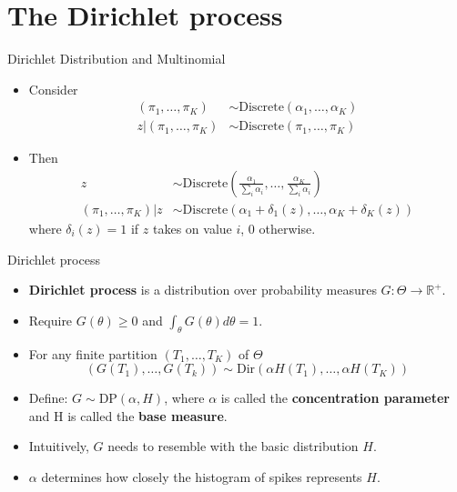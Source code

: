 \documentclass[10pt,mathserif]{beamer}
\begin{document}
\section{The Dirichlet process}
\begin{frame}{Dirichlet Distribution and Multinomial}
\begin{itemize}
    \item Consider
    \begin{equation*}
        \begin{split}
            (\pi_1,\ldots,\pi_K) & \sim \text{Discrete}(\alpha_1,\ldots,\alpha_K)\\ z|(\pi_1,\ldots,\pi_K) & \sim \text{Discrete}(\pi_1,\ldots,\pi_K)
        \end{split}    
    \end{equation*}
    \item Then
    \begin{equation*}
        \begin{split}
            z & \sim  \text{Discrete}(\frac{\alpha_1}{\sum_i\alpha_i},\ldots, \frac{\alpha_K}{\sum_i\alpha_i})\\
            (\pi_1,\ldots,\pi_K)|z & \sim \text{Discrete}(\alpha_1 +  \delta_1(z),\ldots,\alpha_K + \delta_K(z))
        \end{split}
    \end{equation*}
    where $\delta_i(z) =1$ if $z$ takes on value $i$, $0$ otherwise.
\end{itemize}    
\end{frame}

\begin{frame}{Dirichlet process} 
\begin{itemize}
    \item \textbf{Dirichlet process} is a distribution over probability measures $G: \Theta \rightarrow \mathbb{R}^+$.
    \item Require $G(\theta) \geq 0$ and $\int_\theta G(\theta)d\theta = 1$.
    \item For any finite partition $(T_1,\ldots,T_K)$ of $\Theta$
    \begin{equation*}
        (G(T_1),\ldots,G(T_k))\sim\text{Dir}(\alpha H(T_1),\ldots, \alpha H(T_K )) 
    \end{equation*}
    \item Define: $G \sim \text{DP}(\alpha,H)$, where $\alpha$ is called the \textbf{concentration parameter} and H is called the \textbf{base measure}.
    \item Intuitively, $G$ needs to resemble with the basic distribution $H$.
    \item $\alpha$ determines how closely the histogram of spikes represents $H$.
\end{itemize}    
\end{frame}
\end{document}
